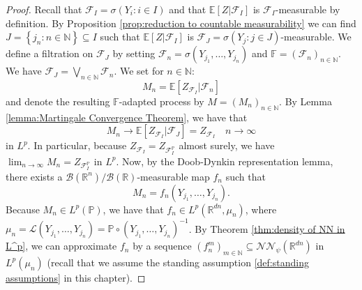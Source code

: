 \documentclass[11pt,a4paper,twoside,openany]{report}
\numberwithin{equation}{section}
\theoremstyle{plain} %
\theoremstyle{definition} %
\theoremstyle{remark} %
\begin{document}
\begin{proof}
Recall that \(\mathcal{F}_I=\sigma(Y_i:i\in I)\) and that \(\mathbb{E}[Z|\mathcal{F}_I]\) is \(\mathcal{F}_I\)-measurable by definition. 
By Proposition \ref{prop:reduction to countable measurability} we can find \(J= \left\{j_n:n\in\mathbb{N}\right\}\subseteq I\) such that \(\mathbb{E}[Z|\mathcal{F}_I]\) is \(\mathcal{F}_J=\sigma(Y_j:j\in J)\)-measurable. We define a filtration on \(\mathcal{F}_J\) by setting \(\mathcal{F}_n=\sigma(Y_{j_1},\dots,Y_{j_n})\) and \(\mathbb{F}=(\mathcal{F}_{n})_{n\in\mathbb{N}}\). We have \(\mathcal{F}_J=\bigvee_{n\in\mathbb{N}}\mathcal{F}_n\). We set for \(n\in\mathbb{N}\):
\begin{equation*}
    M_n=\mathbb{E}[Z_{\mathcal{F}_I}|\mathcal{F}_n]
\end{equation*}
and denote the resulting \(\mathbb{F}\)-adapted process by \(M=(M_n)_{n\in\mathbb{N}}\). By Lemma \ref{lemma:Martingale Convergence Theorem}, we have that 
\begin{equation*}
    M_n\to\mathbb{E}[Z_{\mathcal{F}_I}|\mathcal{F}_J]=Z_{\mathcal{F}_I}\quad n\to\infty
\end{equation*}
in \(L^p\).
In particular, because \(Z_{\mathcal{F}_I}=Z_{\mathcal{F}_I^{\mathbb{P}}}\) almost surely, we have \(\lim_{n\to\infty}M_n=Z_{\mathcal{F}_I^{\mathbb{P}}}\) in \(L^p\). Now, by the Doob-Dynkin representation lemma, there exists a \(\mathcal{B}(\mathbb{R}^n)/\mathcal{B}(\mathbb{R})\)-measurable map \(f_n\) such that 
\begin{equation*}
    M_n = f_n(Y_{j_1},\dots,Y_{j_n}).
\end{equation*}
Because \(M_n\in L^p(\mathbb{P})\), we have that \(f_n\in L^p(\mathbb{R}^{dn},\mu_n)\), where \(\mu_n=\mathcal{L}(Y_{j_1},\dots,Y_{j_n})=\mathbb{P}\circ(Y_{j_1},\dots,Y_{j_n})^{-1}\). By Theorem \ref{thm:density of NN in L^p}, we can approximate \(f_n\) by a sequence \((f_n^m)_{m\in\mathbb{N}}\subseteq \mathcal{NN}_\psi({\mathbb{R}^{dn}})\) in \(L^p(\mu_n)\) (recall that we assume the standing assumption \ref{def:standing assumptions} in this chapter). 



\end{proof}
\end{document}
